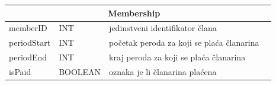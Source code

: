 \documentclass{article}
\begin{document}
\begin{center}
    \begin{tabular}{ | l | l | l | p{5cm} |}
    \hline
    \multicolumn{3}{|c|}{Membership}  \\ \hline
   \cellcolor{green!25}memberID & INT & jedinstveni identifikator člana \\ \hline
    periodStart & INT & početak peroda za koji se plaća članarina \\ \hline
    periodEnd & INT & kraj peroda za koji se plaća članarina \\ \hline
      isPaid & BOOLEAN & oznaka je li članarina plaćena\\ \hline
      
    \end{tabular}
\end{center}
\end{document}
